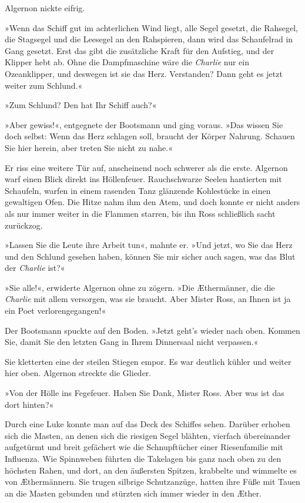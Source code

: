 Algernon nickte eifrig.

»Wenn das Schiff gut im achterlichen Wind liegt, alle Segel
gesetzt, die Rahsegel, die Stagsegel und die Leesegel an den
Rahspieren, dann wird das Schaufelrad in Gang gesetzt. Erst das
gibt die zusätzliche Kraft für den Aufstieg, und der Klipper hebt
ab. Ohne die Dampfmaschine wäre die \textit{Charlie} nur ein Ozeanklipper,
und deswegen ist sie das Herz. Verstanden? Dann geht es jetzt
weiter zum Schlund.«

»Zum Schlund? Den hat Ihr Schiff auch?«

»Aber gewiss!«, entgegnete der Bootsmann und ging voraus. »Das
wissen Sie doch selbst: Wenn das Herz schlagen soll, braucht der
Körper Nahrung. Schauen Sie hier herein, aber treten Sie nicht zu
nahe.«

Er riss eine weitere Tür auf, anscheinend noch schwerer als die
erste. Algernon warf einen Blick direkt ins Höllenfeuer.
Rauchschwarze Seelen hantierten mit Schaufeln, warfen in einem
rasenden Tanz glänzende Kohlestücke in einen gewaltigen Ofen. Die
Hitze nahm ihm den Atem, und doch konnte er nicht anders als nur
immer weiter in die Flammen starren, bis ihn Ross schließlich sacht
zurückzog.

»Lassen Sie die Leute ihre Arbeit tun«, mahnte er. »Und jetzt, wo
Sie das Herz und den Schlund gesehen haben, können Sie mir sicher
auch sagen, was das Blut der \textit{Charlie} ist?«

»Sie alle!«, erwiderte Algernon ohne zu zögern. »Die Æthermänner,
die die \textit{Charlie} mit allem versorgen, was sie braucht. Aber Mister
Ross, an Ihnen ist ja ein Poet verlorengegangen!«

Der Bootsmann spuckte auf den Boden. »Jetzt geht’s wieder nach
oben. Kommen Sie, damit Sie den letzten Gang in Ihrem Dinnersaal
nicht verpassen.«

\bigpar

Sie kletterten eine der steilen Stiegen empor. Es war deutlich
kühler und weiter hier oben. Algernon streckte die Glieder.

»Von der Hölle ins Fegefeuer. Haben Sie Dank, Mister Ross. Aber was
ist das dort hinten?«

Durch eine Luke konnte man auf das Deck des Schiffes sehen. Darüber
erhoben sich die Masten, an denen sich die riesigen Segel blähten,
vierfach übereinander aufgetürmt und breit gefächert wie die
Schnupftücher einer Riesenfamilie mit Influenza. Wie Spinnweben
führten die Takelagen bis ganz nach oben zu den höchsten Rahen, und
dort, an den äußersten Spitzen, krabbelte und wimmelte es von
Æthermännern. Sie trugen silbrige Schutzanzüge, hatten ihre Füße
mit Tauen an die Masten gebunden und stürzten sich immer wieder in
den Æther.

